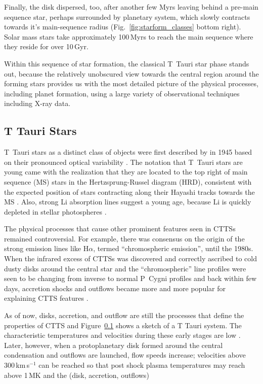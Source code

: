 \documentclass[graybox, nosecnum]{svmult}
\begin{document}
Finally, the disk dispersed, too, after another few Myrs leaving behind a pre-main sequence star, perhaps surrounded by planetary system, which slowly contracts towards it's  main-sequence radius (Fig.~\ref{fig:starform_classes} bottom right). Solar mass stars take approximately 100\,Myrs to reach the main sequence where they reside for over 10\,Gyr.

Within this sequence of star formation, the classical T~Tauri star phase stands out, because the relatively unobscured view towards the central region around the forming stars provides us with the most detailed picture of the physical processes, including planet formation, using a large variety of observational techniques including X-ray data.

\subsection{T Tauri Stars}
T~Tauri stars as a distinct class of objects were first described by \citeauthor{Joy_1945} in 1945 based on their pronounced optical variability \citep{Joy_1945}. The notation that T~Tauri stars are young came with the realization that they are located to the top right of  main sequence (MS) stars in the Hertzsprung-Russel diagram (HRD), consistent with the expected position of stars contracting along their Hayashi tracks towards the MS \citep{Hayashi_1961}. Also, strong Li absorption lines suggest a young age, because  Li is quickly depleted in stellar photospheres \citep{Magazzu_1992}.

The physical processes that cause other prominent features seen in CTTSs remained controversial. For example, there was consensus on the origin of the
strong emission lines like H$\alpha$, termed “chromospheric emission”, until the 1980s. When the infrared excess of CTTSs was discovered and correctly ascribed to cold dusty disks around the central star and the ``chromospheric'' line profiles were seen to be changing from inverse to normal P~Cygni profiles and back within few days, accretion shocks and outflows became more and more popular for explaining CTTS features \citep[as nicely described in][]{Bertout_2007}.

As of now, disks, accretion, and outflow are still the processes that define the properties of CTTS and Figure~\ref{} shows a sketch of a T Tauri system.
%
The characteristic temperatures and velocities during these early stages are low \citep[tens of K and few km\,s$^{-1}$][]{}. Later, however, when a protoplanetary disk formed around the central condensation and outflows are launched, flow speeds increase; velocities above 300\,km\,s$^{-1}$ can be reached so that post shock plasma temperatures may reach above 1\,MK and the 
{\color{blue}(disk, accretion, outflows)}
\end{document}
